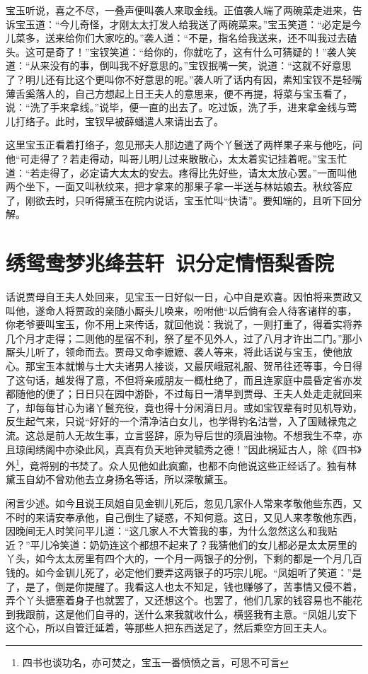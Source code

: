 \documentclass[12pt,oneside]{book}
\begin{document}
宝玉听说，喜之不尽，一叠声便叫袭人来取金线。正值袭人端了两碗菜走进来，告诉宝玉道：“今儿奇怪，才刚太太打发人给我送了两碗菜来。”宝玉笑道：“必定是今儿菜多，送来给你们大家吃的。”袭人道：“不是，指名给我送来，还不叫我过去磕头。这可是奇了！”宝钗笑道：“给你的，你就吃了，这有什么可猜疑的！”袭人笑道：“从来没有的事，倒叫我不好意思的。”宝钗抿嘴一笑，说道：“这就不好意思了？明儿还有比这个更叫你不好意思的呢。”袭人听了话内有因，素知宝钗不是轻嘴薄舌奚落人的，自己方想起上日王夫人的意思来，便不再提，将菜与宝玉看了，说：“洗了手来拿线。”说毕，便一直的出去了。吃过饭，洗了手，进来拿金线与莺儿打络子。此时，宝钗早被薛蟠遣人来请出去了。

这里宝玉正看着打络子，忽见邢夫人那边遣了两个丫鬟送了两样果子来与他吃，问他“可走得了？若走得动，叫哥儿明儿过来散散心，太太着实记挂着呢。”宝玉忙道：“若走得了，必定请大太太的安去。疼得比先好些，请太太放心罢。”一面叫他两个坐下，一面又叫秋纹来，把才拿来的那果子拿一半送与林姑娘去。秋纹答应了，刚欲去时，只听得黛玉在院内说话，宝玉忙叫“快请”。要知端的，且听下回分解。

 
\chapter{绣鸳鸯梦兆绛芸轩~识分定情悟梨香院}
话说贾母自王夫人处回来，见宝玉一日好似一日，心中自是欢喜。因怕将来贾政又叫他，遂命人将贾政的亲随小厮头儿唤来，吩咐他“以后倘有会人待客诸样的事，你老爷要叫宝玉，你不用上来传话，就回他说：我说了，一则打重了，得着实将养几个月才走得；二则他的星宿不利，祭了星不见外人，过了八月才许出二门。”那小厮头儿听了，领命而去。贾母又命李嬷嬷、袭人等来，将此话说与宝玉，使他放心。那宝玉本就懒与士大夫诸男人接谈，又最厌峨冠礼服、贺吊往还等事，今日得了这句话，越发得了意，不但将亲戚朋友一概杜绝了，而且连家庭中晨昏定省亦发都随他的便了；日日只在园中游卧，不过每日一清早到贾母、王夫人处走走就回来了，却每每甘心为诸丫鬟充役，竟也得十分闲消日月。或如宝钗辈有时见机导劝，反生起气来，只说“好好的一个清净洁白女儿，也学得钓名沽誉，入了国贼禄鬼之流。这总是前人无故生事，立言竖辞，原为导后世的须眉浊物。不想我生不幸，亦且琼闺绣阁中亦染此风，真真有负天地钟灵毓秀之德！”因此祸延古人，除《四书》外\footnote{四书也谈功名，亦可焚之，宝玉一番愤愤之言，可思不可言}，竟将别的书焚了。众人见他如此疯癫，也都不向他说这些正经话了。独有林黛玉自幼不曾劝他去立身扬名等话，所以深敬黛玉。

闲言少述。如今且说王凤姐自见金钏儿死后，忽见几家仆人常来孝敬他些东西，又不时的来请安奉承他，自己倒生了疑惑，不知何意。这日，又见人来孝敬他东西，因晚间无人时笑问平儿道：“这几家人不大管我的事，为什么忽然这么和我贴近？”平儿冷笑道：奶奶连这个都想不起来了？我猜他们的女儿都必是太太房里的丫头，如今太太房里有四个大的，一个月一两银子的分例，下剩的都是一个月几百钱的。如今金钏儿死了，必定他们要弄这两银子的巧宗儿呢。“凤姐听了笑道：”是了，是了，倒是你提醒了。我看这人也太不知足，钱也赚够了，苦事情又侵不着，弄个丫头搪塞着身子也就罢了，又还想这个。也罢了，他们几家的钱容易也不能花到我跟前，这是他们自寻的，送什么来我就收什么，横竖我有主意。“凤姐儿安下这个心，所以自管迁延着，等那些人把东西送足了，然后乘空方回王夫人。
\end{document}
